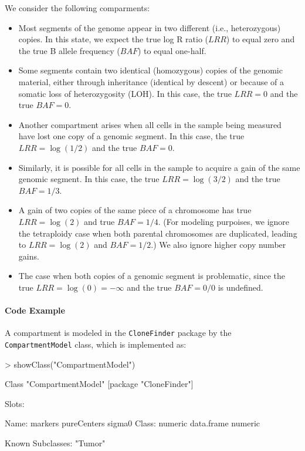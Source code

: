 \documentclass{article}
\begin{document}
We consider the following comparments:
\begin{itemize}
\item Most segments of the genome appear in two different (i.e.,
  heterozygous) copies.  In this state, we expect the true log R ratio
  ($LRR$) to equal zero and the true B allele frequency ($BAF$) to
  equal one-half.
\item Some segments contain two identical (homozygous) copies of the
  genomic material, either through inheritance (identical by descent)
  or because of a somatic loss of heterozygosity (LOH).  In this case,
  the true $LRR = 0$ and the true $BAF = 0$.
\item Another compartment arises when all cells in the sample being
  measured have lost one copy of a genomic segment.  In this case,
  the true $LRR = \log(1/2)$ and the true $BAF = 0$.
\item Similarly, it is possible for all cells in the sample to acquire a
  gain of the same genomic segment.  In this case, the true
  $LRR=\log(3/2)$ and the true $BAF = 1/3$.
\item A gain of two copies of the same piece of a chromosome has true
  $LRR=\log(2)$ and true $BAF = 1/4$.   (For modeling purpoises, we
  ignore the tetraploidy case when both parental chromosomes are
  duplicated, leading to $LRR=\log(2)$ and $BAF = 1/2$.)  We also
  ignore higher copy number gains. 
\item The case when both copies of a genomic segment is problematic,
  since the true $LRR = \log(0) = -\infty$ and the true $BAF = 0/0$ is
  undefined.
\end{itemize}

\paragraph{Code Example}
A compartment is modeled in the \texttt{CloneFinder} package by the
\texttt{CompartmentModel} class, which is implemented as:
\begin{Schunk}
\begin{Sinput}
> showClass("CompartmentModel")
\end{Sinput}
\begin{Soutput}
Class "CompartmentModel" [package "CloneFinder"]

Slots:
                                          
Name:      markers pureCenters      sigma0
Class:     numeric  data.frame     numeric

Known Subclasses: "Tumor"
\end{Soutput}
\end{Schunk}
\end{document}
